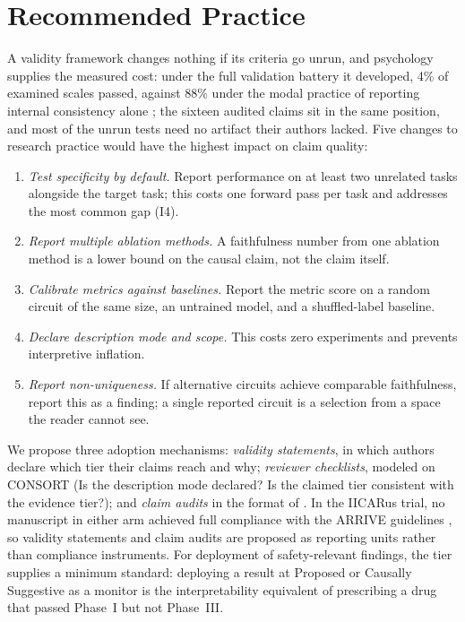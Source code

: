 \documentclass{article}
\begin{document}
\section{Recommended Practice}
\label{sec:practice}

A validity framework changes nothing if its criteria go unrun, and psychology supplies the measured cost: under the full validation battery it developed, 4\% of examined scales passed, against 88\% under the modal practice of reporting internal consistency alone \citep{hussey2020hidden}; the sixteen audited claims sit in the same position, and most of the unrun tests need no artifact their authors lacked. Five changes to research practice would have the highest impact on claim quality:
\begin{enumerate}[nosep]
\item \emph{Test specificity by default.} Report performance on at least two unrelated tasks alongside the target task; this costs one forward pass per task and addresses the most common gap (I4).
\item \emph{Report multiple ablation methods.} A faithfulness number from one ablation method is a lower bound on the causal claim, not the claim itself.
\item \emph{Calibrate metrics against baselines.} Report the metric score on a random circuit of the same size, an untrained model, and a shuffled-label baseline.
\item \emph{Declare description mode and scope.} This costs zero experiments and prevents interpretive inflation.
\item \emph{Report non-uniqueness.} If alternative circuits achieve comparable faithfulness, report this as a finding; a single reported circuit is a selection from a space the reader cannot see.
\end{enumerate}

We propose three adoption mechanisms: \emph{validity statements}, in which authors declare which tier their claims reach and why; \emph{reviewer checklists}, modeled on CONSORT (Is the description mode declared? Is the claimed tier consistent with the evidence tier?); and \emph{claim audits} in the format of . In the IICARus trial, no manuscript in either arm achieved full compliance with the ARRIVE guidelines \citep{hair2019randomised}, so validity statements and claim audits are proposed as reporting units rather than compliance instruments. For deployment of safety-relevant findings, the tier supplies a minimum standard: deploying a result at Proposed or Causally Suggestive as a monitor is the interpretability equivalent of prescribing a drug that passed Phase~I but not Phase~III.
\end{document}
